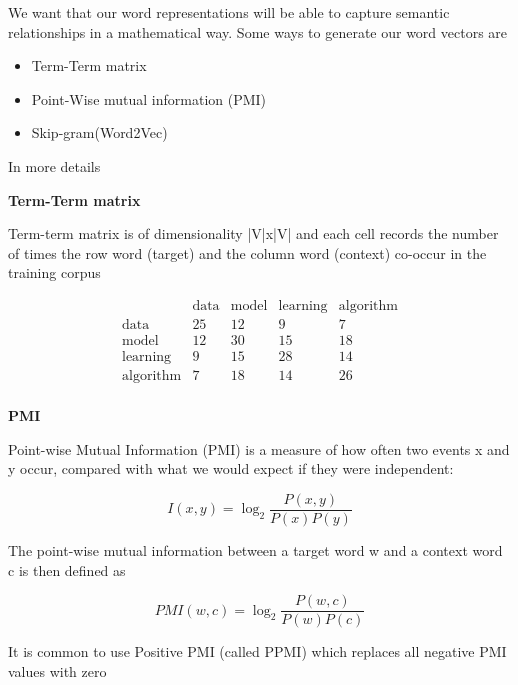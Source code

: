 \vspace{10pt}

We want that our word representations will be able to capture semantic relationships in a mathematical way. Some ways to generate our word vectors are
\begin{itemize}
    \item Term-Term matrix
    \item Point-Wise mutual information (PMI)
    \item Skip-gram(Word2Vec)
\end{itemize}


\vspace{10pt}

In more details

\vspace{10pt}
\textbf{Term-Term matrix}
\vspace{10pt}

Term-term matrix is of dimensionality |V|x|V| and each cell records the number
of times the row word (target) and the column word (context) co-occur in the
training corpus
\vspace{10pt}

\[
\begin{array}{c|cccc}
    & \text{data} & \text{model} & \text{learning} & \text{algorithm} \\
\hline
\text{data}      & 25 & 12 & 9  & 7  \\
\text{model}     & 12 & 30 & 15 & 18 \\
\text{learning}  & 9  & 15 & 28 & 14 \\
\text{algorithm} & 7  & 18 & 14 & 26 \\
\end{array}
\]

\vspace{10pt}
\textbf{PMI}
\vspace{10pt}

Point-wise Mutual Information (PMI) is a measure of how often two
events x and y occur, compared with what we would expect if they
were independent:

\[
I(x, y) = \log_2 \frac{P(x, y)}{P(x)P(y)}
\]

The point-wise mutual information between a target word w and a
context word c is then defined as

\[
PMI(w, c) = \log_2 \frac{P(w, c)}{P(w)P(c)}
\]

It is common to use Positive PMI (called PPMI) which replaces all negative
PMI values with zero

